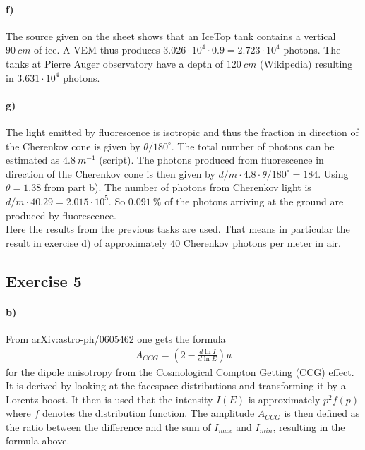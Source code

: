 \documentclass{article}
\begin{document}
\paragraph{f)}
The source given on the sheet shows that an IceTop tank contains a vertical $90\ cm$ of ice. A VEM thus produces $3.026 \cdot 10^4 \cdot 0.9 = 2.723 \cdot 10^4$ photons.
The tanks at Pierre Auger observatory have a depth of $120\ cm$ (Wikipedia) resulting in $3.631 \cdot 10^4$ photons.

\paragraph{g)}
The light emitted by fluorescence is isotropic and thus the fraction in direction of the Cherenkov cone is given by $\theta / 180^\circ$.
The total number of photons can be estimated as $4.8\ m^{-1}$ (script). The photons produced from fluorescence in direction of the Cherenkov cone is then given by $d/m \cdot 4.8 \cdot \theta / 180^\circ = 184$. Using $\theta = 1.38$ from part b).
The number of photons from Cherenkov light is $d/m \cdot 40.29 = 2.015 \cdot 10^5$.
So $0.091\ \%$ of the photons arriving at the ground are produced by fluorescence.\\
Here the results from the previous tasks are used. That means in particular the result in exercise d) of approximately 40 Cherenkov photons per meter in air.

\subsection*{Exercise 5}

\paragraph{b)}
From arXiv:astro-ph/0605462 one gets the formula
\begin{align*}
A_{CCG} = \left( 2 - \frac{d \ln I}{d \ln E} \right) u
\end{align*}
for the dipole anisotropy from the Cosmological Compton Getting (CCG) effect.
It is derived by looking at the facespace distributions and transforming it by a Lorentz boost.
It then is used that the intensity $I(E)$ is approximately $p^2f(p)$ where $f$ denotes the distribution function.
The amplitude $A_{CCG}$ is then defined as the ratio between the difference and the sum of $I_{max}$ and $I_{min}$, resulting in the formula above.
\end{document}
